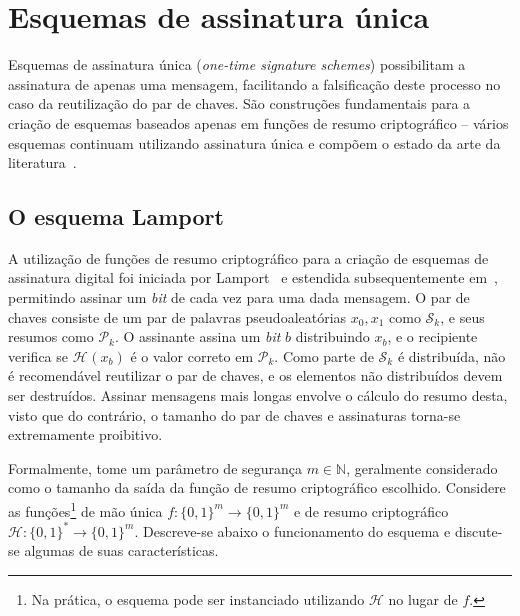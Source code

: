 \documentclass[12pt,notitlepage]{report}
\newcommand{\hh}{\mathcal{H}}
\newcommand{\pk}{\mathcal{P}_k}
\newcommand{\sk}{\mathcal{S}_k}
\newcommand{\hash}[2][]{\mathcal{H}^{#1}(#2)}
\newcommand{\binwds}[1]{\{0, 1\}^{#1}}
\newcommand{\fhash}[1]{\hh{} : \binwds{*} \longrightarrow \binwds{#1}}
\begin{document}
\section{Esquemas de assinatura única}

Esquemas de assinatura única (\emph{one-time signature schemes}) possibilitam a
assinatura de apenas uma mensagem, facilitando a falsificação deste processo no
caso da reutilização do par de chaves. São construções fundamentais para a
criação de esquemas baseados apenas em funções de resumo criptográfico --
vários esquemas continuam utilizando assinatura única e compõem o estado da
arte da literatura~\cite{sphincsplus,irtf-cfrg-xmss-hash-based-signatures-12}.

\subsection{O esquema Lamport}

A utilização de funções de resumo criptográfico para a criação de esquemas de
assinatura digital foi iniciada por Lamport~\cite{lamport1979constructing}
e estendida subsequentemente em~\cite{Diffie:2006:NDC:2263321.2269104, Merkle:1989:CDS:118209.118230},
permitindo assinar um \emph{bit} de cada vez para uma dada mensagem. O par de
chaves consiste de um par de palavras pseudoaleatórias $x_0, x_1$ como $\sk{}$,
e seus resumos como $\pk{}$. O assinante assina um \emph{bit} $b$ distribuindo
$x_b$, e o recipiente verifica se $\hash{x_b}$ é o valor correto em $\pk{}$.
Como parte de $\sk{}$ é distribuída, não é recomendável reutilizar o par de
chaves, e os elementos não distribuídos devem ser destruídos. Assinar mensagens
mais longas envolve o cálculo do resumo desta, visto que do contrário, o
tamanho do par de chaves e assinaturas torna-se extremamente proibitivo.

Formalmente, tome um parâmetro de segurança $m \in \mathbb{N}$, geralmente considerado como o
tamanho da saída da função de resumo criptográfico escolhido. Considere as
funções\footnote{Na prática, o esquema pode ser instanciado utilizando $\hh{}$
no lugar de $f$.} de mão única $f : \binwds{m} \longrightarrow \binwds{m}$ e de
resumo criptográfico $\fhash{m}$.  Descreve-se abaixo o funcionamento do
esquema e discute-se algumas de suas características.
\end{document}
